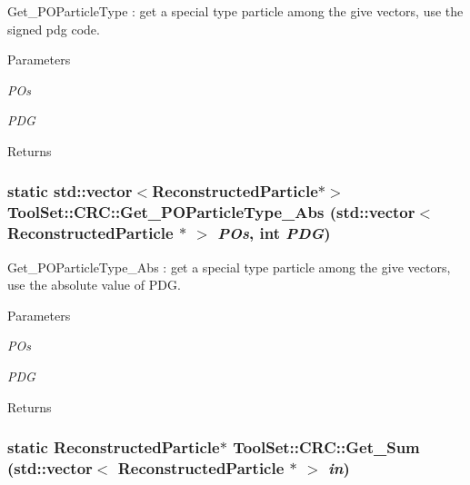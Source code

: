 Get\_\-POParticleType : get a special type particle among the give vectors, use the signed pdg code. 
\begin{DoxyParams}{Parameters}
\item[{\em POs}]\item[{\em PDG}]\end{DoxyParams}
\begin{DoxyReturn}{Returns}

\end{DoxyReturn}
\hypertarget{classToolSet_1_1CRC_ad0f9459b95ec7aae88c527b360cbcc3c}{
\subsubsection[{Get\_\-POParticleType\_\-Abs}]{\setlength{\rightskip}{0pt plus 5cm}static std::vector$<$ReconstructedParticle$\ast$$>$ ToolSet::CRC::Get\_\-POParticleType\_\-Abs (std::vector$<$ ReconstructedParticle $\ast$ $>$ {\em POs}, \/  int {\em PDG})}}
\label{classToolSet_1_1CRC_ad0f9459b95ec7aae88c527b360cbcc3c}


Get\_\-POParticleType\_\-Abs : get a special type particle among the give vectors, use the absolute value of PDG. 
\begin{DoxyParams}{Parameters}
\item[{\em POs}]\item[{\em PDG}]\end{DoxyParams}
\begin{DoxyReturn}{Returns}

\end{DoxyReturn}
\hypertarget{classToolSet_1_1CRC_a466dba941b8cba920e96f28d2d67af1d}{
\subsubsection[{Get\_\-Sum}]{\setlength{\rightskip}{0pt plus 5cm}static ReconstructedParticle$\ast$ ToolSet::CRC::Get\_\-Sum (std::vector$<$ ReconstructedParticle $\ast$ $>$ {\em in})}}
\label{classToolSet_1_1CRC_a466dba941b8cba920e96f28d2d67af1d}


